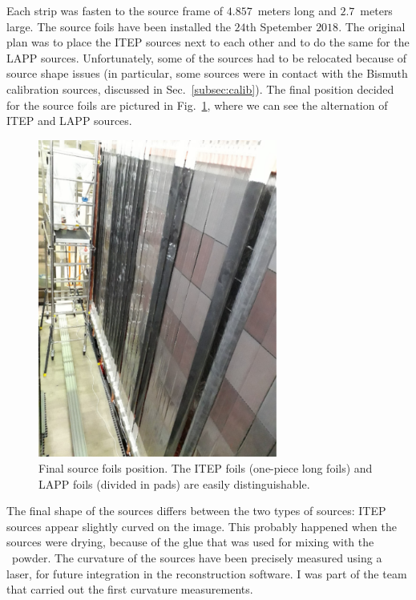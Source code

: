 Each strip was fasten to the source frame of $4.857$~meters long and $2.7$~meters large.
The source foils have been installed the $24$th Spetember $2018$.
The original plan was to place the ITEP sources next to each other and to do the same for the LAPP sources.
Unfortunately, some of the sources had to be relocated because of source shape issues (in particular, some sources were in contact with the Bismuth calibration sources, discussed in Sec.~\ref{subsec:calib}).
The final position decided for the source foils are pictured in Fig.~\ref{fig:source_foils_installation}, where we can see the alternation of ITEP and LAPP sources.
\begin{figure}[h!]
\centering
\includegraphics[width=0.7\textwidth]{SNdemonstrator/fig_SNdemonstrator/source_foils_final_position.pdf}
\caption{Final source foils position.
  The ITEP foils (one-piece long foils) and LAPP foils (divided in pads) are easily distinguishable.
\label{fig:source_foils_installation}}
\end{figure}
The final shape of the sources differs between the two types of sources: ITEP sources appear slightly curved on the image.
This probably happened when the sources were drying, because of the glue that was used for mixing with the \Se\ powder.
The curvature of the sources have been precisely measured using a laser, for future integration in the reconstruction software.
I was part of the team that carried out the first curvature measurements.

